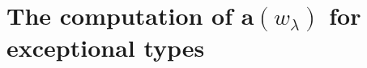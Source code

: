 \documentclass[reqno,12pt]{amsart}
\numberwithin{equation}{section}
\theoremstyle{plain}
\newtheorem{Thm}{Theorem}[section]
\newtheorem{Prop}[Thm]{Proposition}
\theoremstyle{definition}
\newcommand{\lam}{\lambda}
\newcommand{\aff}{ \mathbf{a} }
\begin{document}











%









\section{The computation of \texorpdfstring{$\aff(w_{\lam})$}{} for exceptional types}\label{a-value-compu}
\end{document}
